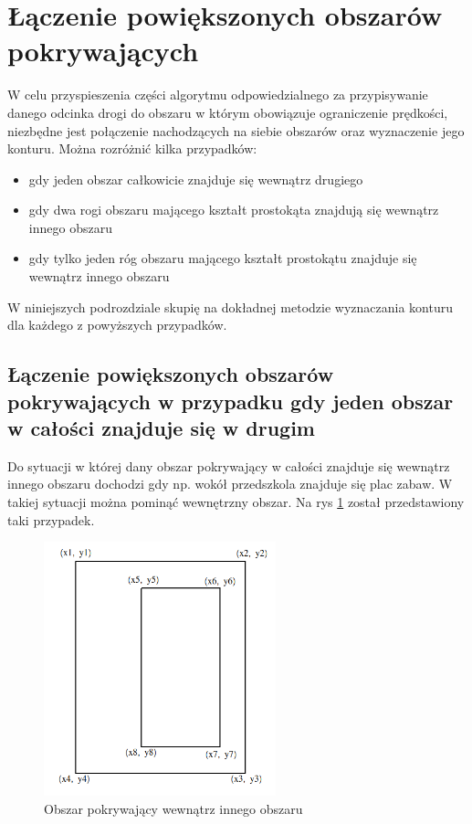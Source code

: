 \newpage
\section{Łączenie powiększonych obszarów pokrywających}
\label{sec:laczeniepowiekszonychobszarwwpokrywajacych}

W celu przyspieszenia części algorytmu odpowiedzialnego za przypisywanie danego odcinka drogi do obszaru w którym obowiązuje ograniczenie prędkości, niezbędne jest połączenie nachodzących na siebie obszarów oraz wyznaczenie jego konturu. Można rozróżnić kilka przypadków:
\begin{itemize}
\item gdy jeden obszar całkowicie znajduje się wewnątrz drugiego
\item gdy dwa rogi obszaru mającego kształt prostokąta znajdują się wewnątrz innego obszaru
\item gdy tylko jeden róg obszaru mającego kształt prostokątu znajduje się wewnątrz innego obszaru
\end{itemize}
W niniejszych podrozdziale skupię na dokładnej metodzie wyznaczania konturu dla każdego z powyższych przypadków.

\subsection{Łączenie powiększonych obszarów pokrywających w przypadku gdy jeden obszar w całości znajduje się w drugim}

Do sytuacji w której dany obszar pokrywający w całości znajduje się wewnątrz innego obszaru dochodzi gdy np. wokół przedszkola znajduje się plac zabaw. W takiej sytuacji
można pominąć wewnętrzny obszar. Na rys \ref{fig:boundingBoxInside} został przedstawiony taki przypadek.

\begin{figure}[h]
\caption{Obszar pokrywający wewnątrz innego obszaru}
\label{fig:boundingBoxInside}
\centering
\includegraphics[width=0.6\textwidth]{boundingBoxInside}
\end{figure}

